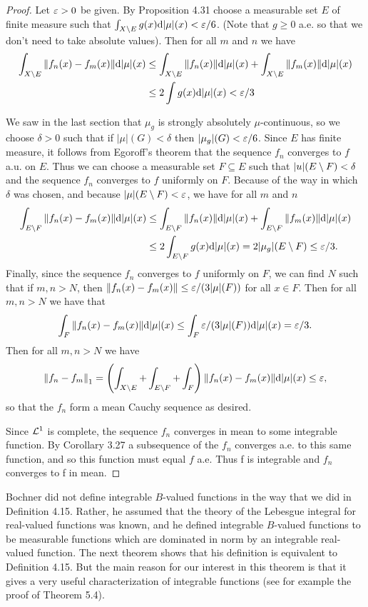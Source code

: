 \begin{proof}
Let $\varepsilon>0$ be given. By Proposition 4.31 choose a measurable set $E$ of finite measure such that $\int_{X\setminus E}g(x)\dd|\mu|(x)<\varepsilon/6$. (Note that $g \geq 0$ a.e. so that we don't need to take absolute values). Then for all $m$ and $n$ we have
\begin{align*}
    \int_{X\setminus E}\norm{f_n(x)-f_m(x)}\dd|\mu|(x)&\leq\int_{X\setminus E}\norm{f_n(x)}\dd|\mu|(x)+\int_{X\setminus E}\norm{f_m(x)}\dd|\mu|(x)\\
    &\leq2\int g(x)\dd|\mu|(x)<\varepsilon/3
\end{align*}

We saw in the last section that $\mu_g$ is strongly absolutely $\mu$-continuous, so we choose $\delta>0$ such that if $|\mu|(G)<\delta$ then $|\mu_g|(G)<\varepsilon/6$. Since $E$ has finite measure, it follows from Egoroff's theorem that the sequence $f_n$ converges to $f$ a.u. on $E$. Thus we can choose a measurable set $F\subseteq E$ such that $|u|(E\setminus F)<\delta$ and the sequence $f_n$ converges to $f$ uniformly on $F$. Because of the way in which $\delta$ was chosen, and because $|\mu|(E\setminus F)<\varepsilon$, we have for all $m$ and $n$ 
\begin{align*}
    \int_{E\setminus F}\norm{f_n(x)-f_m(x)}\dd|\mu|(x)&\leq\int_{E\setminus F}\norm{f_n(x)}\dd|\mu|(x)+\int_{E\setminus F}\norm{f_m(x)}\dd|\mu|(x)\\
    &\leq2\int_{E\setminus F}g(x)\dd|\mu|(x)=2|\mu_g|(E\setminus F)\leq\varepsilon/3.
\end{align*}
Finally, since the sequence $f_n$ converges to $f$ uniformly on $F$, we can find $N$ such that if $m,n>N$, then $\norm{f_n(x)-f_m(x)}\leq\varepsilon/(3|\mu|(F))$ for all $x\in F$. Then for all $m,n>N$ we have that $$\int_F\norm{f_n(x)-f_m(x)}\dd|\mu|(x)\leq\int_F\varepsilon/(3|\mu|(F))\dd|\mu|(x)=\varepsilon/3.$$ Then for all $m,n>N$ we have $$\norm{f_n-f_m}_1=\left(\int_{X\setminus E}+\int_{E\setminus F}+\int_F\right)\norm{f_n(x)-f_m(x)}\dd|\mu|(x)\leq\varepsilon,$$ so that the $f_n$ form a mean Cauchy sequence as desired.

Since ${\cal L}^1$ is complete, the sequence $f_n$ converges in mean to some integrable function. By Corollary 3.27 a subsequence of the $f_n$ converges a.e. to this same function, and so this function must equal $f$ a.e. Thus f is integrable and $f_n$ converges to f in mean.
\end{proof}

Bochner did not define integrable $B$-valued functions in the way that we did in Definition 4.15. Rather, he assumed that the theory of the Lebesgue integral for real-valued functions was known, and he defined integrable $B$-valued functions to be measurable functions which are dominated in norm by an integrable real-valued function. The next theorem shows that his definition is equivalent to Definition 4.15. But the main reason for our interest in this theorem is that it gives a very useful characterization of integrable functions (see for example the proof of Theorem 5.4).

